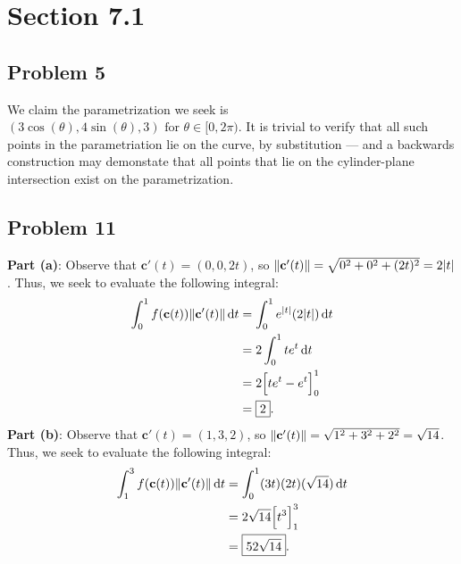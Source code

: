 \documentclass[11pt]{article}
\renewcommand{\vec}[1]{\mathbf{#1}}
\begin{document}

\section{Section 7.1}


\subsection*{Problem 5}

We claim the parametrization we seek is $\boxed{\left( 3 \cos(\theta), 4 \sin(\theta), 3 \right) \text{ for } \theta \in [0, 2\pi)}$. It is trivial to verify that all such points in the parametriation lie on the curve, by substitution --- and a backwards construction may demonstate that all points that lie on the cylinder-plane intersection exist on the parametrization.


\subsection*{Problem 11}

\textbf{Part (a)}: Observe that $\vec{c}'(t) = (0, 0, 2t)$, so $\norm{\vec{c}'(t)} = \sqrt{0^{2} + 0^{2} + (2t)^{2}} = 2 \abs{t}$. Thus, we seek to evaluate the following integral:
\begin{align*}
	\int_{0}^{1} f(\vec{c}(t)) \norm{\vec{c}'(t)} \dd{t} &= \int_{0}^{1} e^{\abs{t}} (2\abs{t}) \dd{t} \\
	&= 2 \int_{0}^{1} t e^{t} \dd{t} \\
	&= 2 \Big[ t e^{t} - e^{t} \Big]_{0}^{1} \\
	&= \boxed{2}.
\end{align*}
\textbf{Part (b)}: Observe that $\vec{c}'(t) = (1, 3, 2)$, so $\norm{\vec{c}'(t)} = \sqrt{1^{2} + 3^{2} + 2^{2}} = \sqrt{14}$. Thus, we seek to evaluate the following integral:
\begin{align*}
	\int_{1}^{3} f(\vec{c}(t)) \norm{\vec{c}'(t)} \dd{t} &= \int_{0}^{1} (3t)(2t) (\sqrt{14}) \dd{t} \\
	&= 2 \sqrt{14} \Big[ t^{3} \Big]_{1}^{3} \\
	&= \boxed{52 \sqrt{14}}.
\end{align*}

\end{document}
